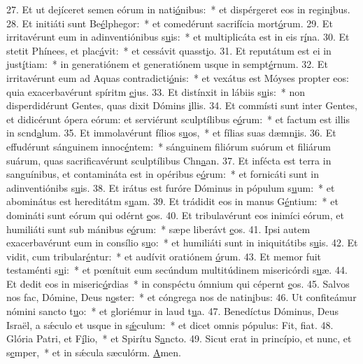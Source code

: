 27. Et ut dejíceret semen eórum in nati\uline{ó}nibus:~* et dispérgeret eos in regin\uline{i}bus.
28. Et initiáti sunt Be\uline{é}lphegor:~* et comedérunt sacrifícia mort\uline{ó}rum.
29. Et irritavérunt eum in adinventiónibus s\uline{u}is:~* et multiplicáta est in eis r\uline{í}na.
30. Et stetit Phínees, et plac\uline{á}vit:~* et cessávit quasst\uline{i}o.
31. Et reputátum est ei in just\uline{í}tiam:~* in generatiónem et generatiónem usque in sempt\uline{é}rnum.
32. Et irritavérunt eum ad Aquas contradicti\uline{ó}nis:~* et vexátus est Móyses propter eos: quia exacerbavérunt spíritm \uline{e}jus.
33. Et distínxit in lábiis s\uline{u}is:~* non disperdidérunt Gentes, quas dixit Dómins \uline{i}llis.
34. Et commísti sunt inter Gentes, et didicérunt ópera eórum: et serviérunt sculptílibus e\uline{ó}rum:~* et factum est illis in scnd\uline{a}lum.
35. Et immolavérunt fílios s\uline{u}os,~* et fílias suas dæmn\uline{i}is.
36. Et effudérunt sánguinem innoc\uline{é}ntem:~* sánguinem filiórum suórum et filiárum suárum, quas sacrificavérunt sculptílibus Chn\uline{a}an.
37. Et infécta est terra in sanguínibus, et contamináta est in opéribus e\uline{ó}rum:~* et fornicáti sunt in adinventiónibs s\uline{u}is.
38. Et irátus est furóre Dóminus in pópulum s\uline{u}um:~* et abominátus est hereditátm s\uline{u}am.
39. Et trádidit eos in manus G\uline{é}ntium:~* et domináti sunt eórum qui odérnt \uline{e}os.
40. Et tribulavérunt eos inimíci eórum, et humiliáti sunt sub mánibus e\uline{ó}rum:~* sæpe liberávt \uline{e}os.
41. Ipsi autem exacerbavérunt eum in consílio s\uline{u}o:~* et humiliáti sunt in iniquitátibs s\uline{u}is.
42. Et vidit, cum tribular\uline{é}ntur:~* et audívit oratiónem \uline{ó}rum.
43. Et memor fuit testaménti s\uline{u}i:~* et pœnítuit eum secúndum multitúdinem misericórdi s\uline{u}æ.
44. Et dedit eos in miseric\uline{ó}rdias~* in conspéctu ómnium qui cépernt \uline{e}os.
45. Salvos nos fac, Dómine, Deus n\uline{o}ster:~* et cóngrega nos de natin\uline{i}bus:
46. Ut confiteámur nómini sancto t\uline{u}o:~* et gloriémur in laud t\uline{u}a.
47. Benedíctus Dóminus, Deus Israël, a sǽculo et usque in s\uline{ǽ}culum:~* et dicet omnis pópulus: Fit, f\uline{i}at.
48. Glória Patri, et F\uline{í}lio,~* et Spirítu S\uline{a}ncto.
49. Sicut erat in princípio, et nunc, et s\uline{e}mper,~* et in sǽcula sæculórm. \uline{A}men.
